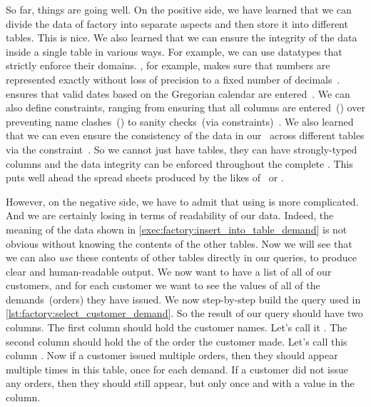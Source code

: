 %
%
%
So far, things are going well.
On the positive side, we have learned that we can divide the data of factory into separate aspects and then store it into different tables.
This is nice.
We also learned that we can ensure the integrity of the data inside a single table in various ways.
For example, we can use datatypes that strictly enforce their domains.
, for example, makes sure that numbers are represented exactly without loss of precision to a fixed number of decimals~\cite{PGDG:PD:NT}.
 ensures that valid dates based on the Gregorian calendar are entered~\cite{PGDG:PD:HU,G1582IG}.
We can also define constraints, ranging from ensuring that all columns are entered~() over preventing name clashes~() to sanity checks~(via  constraints)~\cite{PGDG:PD:C}.
We also learned that we can even ensure the consistency of the data in our \db\ across different tables via the  constraint~\cite{PGDG:PD:FK}.
So we cannot just have tables, they can have strongly-typed columns and the data integrity can be enforced throughout the complete \db.
This puts  well ahead the spread sheets produced by the likes of \microsoftExcel\ or \libreofficeCalc.

However, on the negative side, we have to admit that using  is more complicated.
And we are certainly losing in terms of readability of our data.
Indeed, the meaning of the  data shown in \cref{exec:factory:insert_into_table_demand} is not obvious without knowing the contents of the other tables.
Now we will see that we can also \emph{use} these contents of other tables directly in our queries, to produce clear and human-readable output.%
%
%
%
%
%
%
We now want to have a list of all of our customers, and for each customer we want to see the  values of all of the demands~(orders) they have issued.
We now step-by-step build the query used in \cref{lst:factory:select_customer_demand}.
So the result of our query should have two columns.
The first column should hold the customer names.
Let's call it .
The second column should hold the  of the order the customer made.
Let's call this column .
Now if a customer issued multiple orders, then they should appear multiple times in this table, once for each demand.
If a customer did not issue any orders, then they should still appear, but only once and with a  value in the  column.

